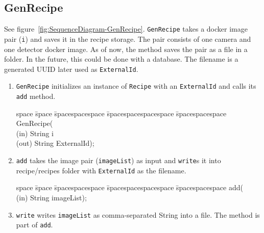 \subsection{GenRecipe} \label{subseb:genrecipe}
See figure~\ref{fig:SequenceDiagram-GenRecipe}.
\texttt{GenRecipe} takes a docker image pair (\texttt{i}) and saves it in the recipe storage. The pair consists of one camera and one detector docker image. As of now, the method saves the pair as a file in a folder. In the future, this could be done with a database. The filename is a generated UUID later used as \texttt{ExternalId}.
\begin{enumerate}
    \item \texttt{GenRecipe} initializes an instance of \texttt{Recipe} with an \texttt{ExternalId} and calls its \texttt{add} method.
    \begin{tabbing}
    space \= space \= spacespacespace \= spacespacespacespace \= spacespacespace \kill
    \>  GenRecipe(\\
    \>  \>  (in)	 \> 	String          \> i\\
    \>  \>  (out)	 \> 	String          \> ExternalId); 
    \end{tabbing}
    \item \texttt{add} takes the image pair (\texttt{imageList}) as input and \texttt{write}s it into recipe/recipes folder with \texttt{ExternalId} as the filename.
    \begin{tabbing}
    space \= space \= spacespacespace \= spacespacespacespace \= spacespacespace \kill
    \>  add(\\
    \>  \>  (in)	 \> 	String          \> imageList);  
    \end{tabbing} \label{sign:add}
    \item \texttt{write} writes \texttt{imageList} as comma-separated String into a file. The method is part of \texttt{add}. \label{sign:write}
\end{enumerate}

